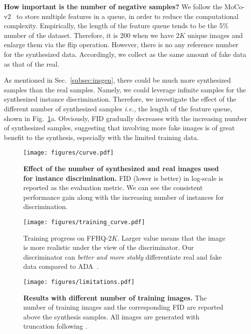 \documentclass{article}
\begin{document}
\noindent\textbf{How important is the number of negative samples?}
We follow the MoCo-v2~\cite{chen2020mocov2} to store multiple features in a queue, in order to reduce the computational complexity. Empirically, the length of the feature queue tends to be the 5\% number of the dataset. Therefore, it is 200 when we have $2K$ unique images and enlarge them via the flip operation. However, there is no any reference number for the synthesized data. Accordingly, we collect as the same amount of fake data as that of the real.


As mentioned in Sec.~\ref{subsec:insgen}, there could be much more synthesized samples than the real samples. Namely, we could leverage infinite samples for the synthesized instance discrimination. Therefore, we investigate the effect of the different number of synthesized samples \textit{i.e.,} the length of the feature queue, shown in Fig.~\ref{fig:curve}a.
Obviously, FID gradually decreases with the increasing number of synthesized samples, suggesting that involving more fake images is of great benefit to the synthesis, especially with the limited training data.


\begin{figure}[t]
	\centering
	\texttt{[image: figures/curve.pdf]}
	\vspace{-20pt}
	\caption{
	    \textbf{Effect of the number of synthesized and real images used for instance discrimination.}
FID (lower is better) in log-scale is reported as the evaluation metric.
We can see the consistent performance gain along with the increasing number of instances for discrimination.
	}
    \label{fig:curve}
    \vspace{-5pt}
\end{figure}


\begin{figure}[t]
	\centering
	\texttt{[image: figures/training\_curve.pdf]}
	\vspace{-20pt}
 	\caption{
        Training progress on FFHQ-2$K$.
Larger value means that the image is more realistic under the view of the discriminator.
Our discriminator can \textit{better and more stably} differentiate real and fake data compared to ADA~\cite{karras2020training}.
 	}
    \label{fig:prob}
    \vspace{-5pt}
\end{figure}


\begin{figure}[t]
	\centering
	\texttt{[image: figures/limitations.pdf]}
	\vspace{-20pt}
	\caption{
	    \textbf{Results with different number of training images.}
The number of training images and the corresponding FID are reported above the synthesis samples.
All images are generated with truncation following \cite{karras2020training}.
	}
    \label{fig:limitations}
    \vspace{-5pt}
\end{figure}
\end{document}
